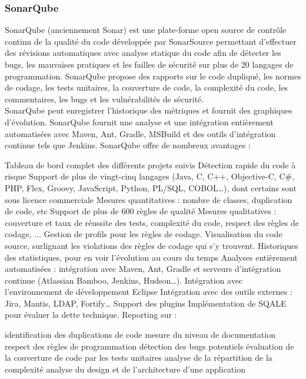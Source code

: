 \subsubsection{SonarQube}
SonarQube (anciennement Sonar) est une plate-forme open source de contrôle continu de la qualité du code développée par SonarSource permettant d'effectuer des révisions automatiques avec analyse statique du code afin de détecter les bugs, les mauvaises pratiques et les failles de sécurité sur plus de 20 langages de programmation. SonarQube propose des rapports sur le code dupliqué, les normes de codage, les tests unitaires, la couverture de code, la complexité du code, les commentaires, les bugs et les vulnérabilités de sécurité.\\
SonarQube peut enregistrer l'historique des métriques et fournit des graphiques d'évolution. SonarQube fournit une analyse et une intégration entièrement automatisées avec  Maven, Ant, Gradle, MSBuild et des outils d'intégration continue tels que Jenkins.
SonarQube offre de nombreux avantages :
\begin{itemize}
	\itemcheck Tableau de bord complet des différents projets suivis
	\itemcheck Détection rapide du code à risque
	\itemcheck Support de plus de vingt-cinq langages (Java, C, C++, Objective-C, C\#, PHP, Flex, Groovy, JavaScript, Python, PL/SQL, COBOL…), dont certains sont sous licence commerciale
	\itemcheck Mesures quantitatives : nombre de classes, duplication de code, etc
	\itemcheck Support de plus de 600 règles de qualité
	\itemcheck Mesures qualitatives : couverture et taux de réussite des tests, complexité du code, respect des règles de codage, ...
	\itemcheck Gestion de profils pour les règles de codage.
	\itemcheck Visualisation du code source, surlignant les violations des règles de codage qui s'y trouvent.
	\itemcheck Historiques des statistiques, pour en voir l'évolution au cours du temps
	\itemcheck Analyses entièrement automatisées : intégration avec Maven, Ant, Gradle et serveurs d'intégration continue (Atlassian Bamboo, Jenkins, Hudson…).
	\itemcheck Intégration avec l'environnement de développement Eclipse
	\itemcheck Intégration avec des outils externes : Jira, Mantis, LDAP, Fortify…
	\itemcheck Support des plugins
	\itemcheck Implémentation de SQALE pour évaluer la dette technique.
	\itemcheck Reporting sur :
	\begin{itemize}
		\itemtirait identification des duplications de code
		\itemtirait mesure du niveau de documentation
		\itemtirait respect des règles de programmation
		\itemtirait détection des bugs potentiels
		\itemtirait évaluation de la couverture de code par les tests unitaires
		\itemtirait analyse de la répartition de la complexité
		\itemtirait analyse du design et de l'architecture d'une application
	\end{itemize}
\end{itemize}
